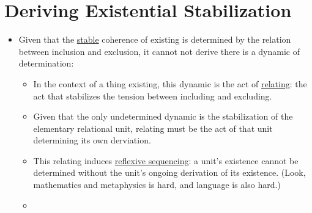 \documentclass[11pt]{article}
\begin{document}
\section*{Deriving Existential Stabilization}
\label{sec:org295c04d}
\begin{itemize}
\item Given that the \href{stable.org}{stable} coherence of existing is determined by the relation between inclusion and exclusion, it cannot not derive there is a dynamic of determination:
\begin{itemize}
\item In the context of a thing existing, this dynamic is the act of \href{relating.org}{relating}: the act that stabilizes the tension between including and excluding.
\item Given that the only undetermined dynamic is the stabilization of the elementary relational unit, relating must be the act of that unit determining its own derviation.
\item This relating induces \href{reflexive-sequencing.org}{reflexive sequencing}: a unit's existence cannot be determined without the unit's ongoing derivation of its existence. (Look, mathematics and metaphysics is hard, and language is also hard.)
\item 
\end{itemize}
\end{itemize}
\end{document}
